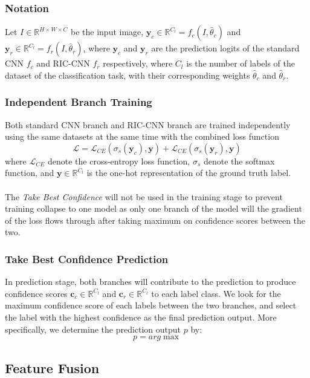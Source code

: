 \subsubsection{Notation}
Let $I \in \mathbb{R}^{H \times W \times C}$ be the input image, $\mathbf{y}_c \in \mathbb{R}^{C_l} = f_c(I, \hat{\theta}_c)$ and $\mathbf{y}_r \in \mathbb{R}^{C_l} = f_r(I, \hat{\theta}_r)$, where $\mathbf{y}_c$ and $\mathbf{y}_r$ are the prediction logits of the standard CNN $f_c$ and RIC-CNN $f_r$ respectively, where $C_l$ is the number of labels of the dataset of the classification task, with their corresponding weights $\hat{\theta}_c$ and $\hat{\theta}_r$.

\subsubsection{Independent Branch Training}
Both standard CNN branch and RIC-CNN branch are trained independently using the same datasets at the same time with the combined loss function
$$
\mathcal{L} = \mathcal{L}_{CE}(\sigma_s(\mathbf{y}_c), \mathbf{y}) + \mathcal{L}_{CE}(\sigma_s(\mathbf{y}_r), \mathbf{y})
$$
where $\mathcal{L}_{CE}$ denote the cross-entropy loss function, $\sigma_s$ denote the softmax function, and $\mathbf{y} \in \mathbb{R}^{C_l}$ is the one-hot representation of the ground truth label.
\\ \\
The \textit{Take Best Confidence} will not be used in the training stage to prevent training collapse to one model as only one branch of the model will the gradient of the loss flows through after taking maximum on confidence scores between the two.

\subsubsection{Take Best Confidence Prediction}
In prediction stage, both branches will contribute to the prediction to produce confidence scores $\mathbf{c}_c \in \mathbb{R}^{C_l}$ and $\mathbf{c}_r \in \mathbb{R}^{C_l}$ to each label class. We look for the maximum confidence score of each labels between the two branches, and select the label with the highest confidence as the final prediction output.
More specifically, we determine the prediction output $p$ by:
$$
p = arg\max
$$
\subsection{Feature Fusion}

